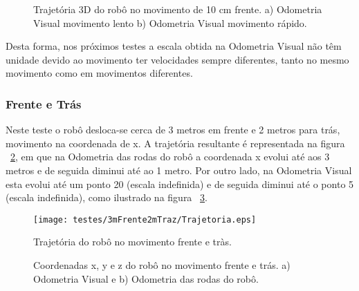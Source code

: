 \begin{figure}[h!]
	\centering
	\qquad
	\caption{Trajetória 3D do robô no movimento de 10 cm frente. a) Odometria Visual movimento lento b) Odometria Visual movimento rápido.}
	\label{fig:traj3D10cm}
\end{figure}




\FloatBarrier
Desta forma, nos próximos testes a escala obtida na Odometria Visual não têm unidade devido ao movimento ter velocidades sempre diferentes, tanto no mesmo movimento como em movimentos diferentes. 



\FloatBarrier
\subsubsection{Frente e Trás}\label{subsubsection:EmFrenteTraz}

Neste teste o robô desloca-se cerca de 3 metros em frente e 2 metros para trás, movimento na coordenada de x. A trajetória resultante é representada na figura ~\ref{fig:trajRobo3mFrente2mTraz}, em que na  Odometria das rodas do robô a coordenada x evolui até aos 3 metros e de seguida diminui até ao 1 metro. Por outro lado,  na Odometria Visual esta evolui até um ponto 20 (escala indefinida) e de seguida diminui até o ponto 5 (escala indefinida), como ilustrado na figura ~\ref{fig:pos3mFrente2mTraz}.


\begin{figure}[h!]
	\begin{center}
		\leavevmode		
		\texttt{[image: testes/3mFrente2mTraz/Trajetoria.eps]}
		\caption{Trajetória do robô no movimento frente e tràs.}
		\label{fig:trajRobo3mFrente2mTraz}
	\end{center}
\end{figure}



\begin{figure}[h!]
	\centering
	\qquad
	\caption{Coordenadas x, y e z do robô  no movimento frente e trás. a) Odometria Visual e b) Odometria das rodas do robô.}
	\label{fig:pos3mFrente2mTraz}
\end{figure}

